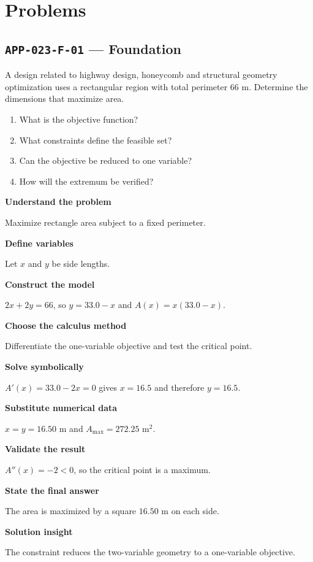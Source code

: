 \documentclass[11pt]{book}
\newcommand{\pid}[1]{\texttt{#1}}
\begin{document}
\section*{Problems}
\subsection*{\pid{APP-023-F-01} — Foundation}
\begin{problembox}
A design related to highway design, honeycomb and structural geometry optimization uses a rectangular region with total perimeter 66 m. Determine the dimensions that maximize area.
\end{problembox}
\begin{promptbox}\begin{enumerate}
\item What is the objective function?
\item What constraints define the feasible set?
\item Can the objective be reduced to one variable?
\item How will the extremum be verified?
\end{enumerate}\end{promptbox}
\begin{solutionbox}
\textbf{Understand the problem}\par Maximize rectangle area subject to a fixed perimeter.\par\medskip
\textbf{Define variables}\par Let $x$ and $y$ be side lengths.\par\medskip
\textbf{Construct the model}\par $2x+2y=66$, so $y=33.0-x$ and $A(x)=x(33.0-x)$.\par\medskip
\textbf{Choose the calculus method}\par Differentiate the one-variable objective and test the critical point.\par\medskip
\textbf{Solve symbolically}\par $A'(x)=33.0-2x=0$ gives $x=16.5$ and therefore $y=16.5$.\par\medskip
\textbf{Substitute numerical data}\par $x=y=16.50$ m and $A_{\max}=272.25$ m$^2$.\par\medskip
\textbf{Validate the result}\par $A''(x)=-2<0$, so the critical point is a maximum.\par\medskip
\textbf{State the final answer}\par The area is maximized by a square $16.50$ m on each side.\par\medskip
\textbf{Solution insight}\par The constraint reduces the two-variable geometry to a one-variable objective.\par\medskip
\end{solutionbox}
\end{document}
